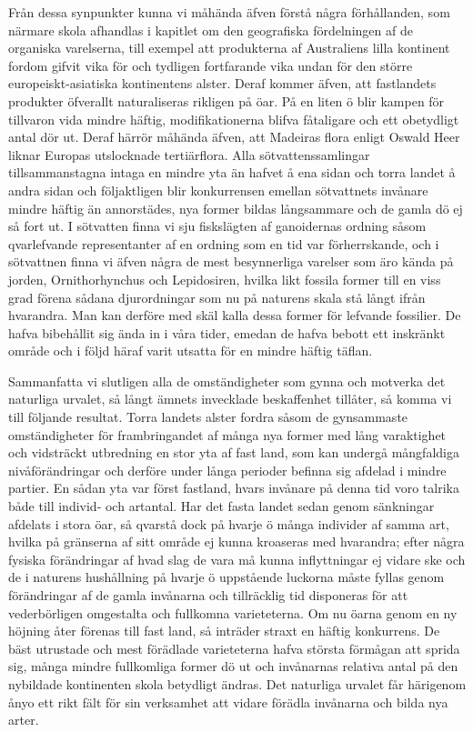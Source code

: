 Från dessa synpunkter kunna vi måhända äfven förstå några förhållanden, som närmare skola afhandlas i kapitlet om den geografiska fördelningen af de organiska varelserna, till exempel att produkterna af Australiens lilla kontinent fordom gifvit vika för och tydligen fortfarande vika undan för den större europeiskt-asiatiska kontinentens alster. Deraf kommer äfven, att fastlandets produkter öfverallt naturaliseras rikligen på öar. På en liten ö blir kampen för tillvaron vida mindre häftig, modifikationerna blifva fåtaligare och ett obetydligt antal dör ut. Deraf härrör måhända äfven, att Madeiras flora enligt Oswald Heer liknar Europas utslocknade tertiärflora. Alla sötvattenssamlingar tillsammanstagna intaga en mindre yta än hafvet å ena sidan och torra landet å andra sidan och följaktligen blir konkurrensen emellan sötvattnets invånare mindre häftig än annorstädes, nya former bildas långsammare och de gamla dö ej så fort ut. I sötvatten finna vi sju fiskslägten af ganoidernas ordning såsom qvarlefvande representanter af en ordning som en tid var förherrskande, och i sötvattnen finna vi äfven några de mest besynnerliga varelser som äro kända på jorden, Ornithorhynchus och Lepidosiren, hvilka likt fossila former till en viss grad förena sådana djurordningar som nu på naturens skala stå långt ifrån hvarandra. Man kan derföre med skäl kalla dessa former för lefvande fossilier. De hafva bibehållit sig ända in i våra tider, emedan de hafva bebott ett inskränkt område och i följd häraf varit utsatta för en mindre häftig täflan.

Sammanfatta vi slutligen alla de omständigheter som gynna och motverka det naturliga urvalet, så långt ämnets invecklade beskaffenhet tillåter, så komma vi till följande resultat. Torra landets alster fordra såsom de gynsammaste omständigheter för frambringandet af många nya former med lång varaktighet och vidsträckt utbredning en stor yta af fast land, som kan undergå mångfaldiga nivåförändringar och derföre under långa perioder befinna sig afdelad i mindre partier. En sådan yta var först fastland, hvars invånare på denna tid voro talrika både till individ- och artantal. Har det fasta landet sedan genom sänkningar afdelats i stora öar, så qvarstå dock på hvarje ö många individer af samma art, hvilka på gränserna af sitt område ej kunna kroaseras med hvarandra; efter några fysiska förändringar af hvad slag de vara må kunna inflyttningar ej vidare ske och de i naturens hushållning på hvarje ö uppstående luckorna måste fyllas genom förändringar af de gamla invånarna och tillräcklig tid disponeras för att vederbörligen omgestalta och fullkomna varieteterna. Om nu öarna genom en ny höjning åter förenas till fast land, så inträder straxt en häftig konkurrens. De bäst utrustade och mest förädlade varieteterna hafva största förmågan att sprida sig, många mindre fullkomliga former dö ut och invånarnas relativa antal på den nybildade kontinenten skola betydligt ändras. Det naturliga urvalet får härigenom ånyo ett rikt fält för sin verksamhet att vidare förädla invånarna och bilda nya arter.

